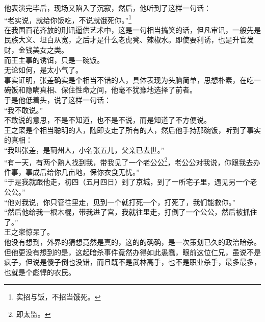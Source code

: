 \begin{multicols}{\theparacolNo}
他表演完毕后，现场又陷入了沉寂，然后，他听到了这样一句话：\\

“老实说，就给你饭吃，不说就饿死你。”\footnote{实招与饭，不招当饿死。}\\

在我国百花齐放的刑讯逼供艺术中，这是一句相当搞笑的话，但凡审讯，一般先是民族大义、坦白从宽，之后才是什么老虎凳、辣椒水。即使要利诱，也是升官发财，金钱美女之类。\\

而王主事的诱饵，只是一碗饭。\\

无论如何，是太小气了。\\

事实证明，张差确实是个相当不错的人，具体表现为头脑简单，思想朴素，在吃一碗饭和隐瞒真相、保住性命之间，他毫不犹豫地选择了前者。\\

于是他低着头，说了这样一句话：\\

“我不敢说。”\\

不敢说的意思，不是不知道，也不是不说，而是知道了不方便说。\\

王之寀是个相当聪明的人，随即支走了所有的人，然后他手持那碗饭，听到了事实的真相：\\

“我叫张差，是蓟州人，小名张五儿，父亲已去世。”\\

“有一天，有两个熟人找到我，带我见了一个老公公\footnote{即太监。}，老公公对我说，你跟我去办件事，事成后给你几亩地，保你衣食无忧。”\\

“于是我就跟他走，初四（五月四日）到了京城，到了一所宅子里，遇见另一个老公公。”\\

“他对我说，你只管往里走，见到一个就打死一个，打死了，我们能救你。”\\

“然后他给我一根木棍，带我进了宫，我就往里走，打倒了一个公公，然后被抓住了。”\\

王之寀惊呆了。\\

他没有想到，外界的猜想竟然是真的，这的的确确，是一次策划已久的政治暗杀。\\

但他更没有想到的是，这起暗杀事件竟然办得如此愚蠢，眼前这位仁兄，虽说不是疯子，但说是傻子倒也没错，而且既不是武林高手，也不是职业杀手，最多最多，也就是个彪悍的农民。\\


\end{multicols}
